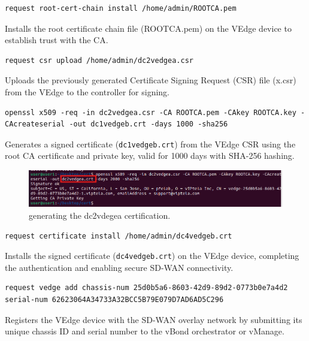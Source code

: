 \documentclass[12pt,english]{report}
\begin{document}
\begin{lstlisting}[style=BashStyle]
request root-cert-chain install /home/admin/ROOTCA.pem
\end{lstlisting}

Installs the root certificate chain file (ROOTCA.pem) on the VEdge device to establish trust with the CA.

\begin{lstlisting}[style=BashStyle]
request csr upload /home/admin/dc2vedgea.csr
\end{lstlisting}

Uploads the previously generated Certificate Signing Request (CSR) file (x.csr) from the VEdge to the controller for signing.

\begin{lstlisting}[style=BashStyle]
openssl x509 -req -in dc2vedgea.csr -CA ROOTCA.pem -CAkey ROOTCA.key -CAcreateserial -out dc1vedgeb.crt -days 1000 -sha256
\end{lstlisting}

Generates a signed certificate (\texttt{dc1vedgeb.crt}) from the VEdge CSR using the root CA certificate and private key, valid for 1000 days with SHA-256 hashing.

\begin{figure}[H]
    \centering
    \includegraphics[width=1\textwidth]{appendix/dc2vedgea-crt.png}
    \caption{generating the dc2vdegea certification.}
    \label{fig:dc2vdegea certification}
\end{figure}

\begin{lstlisting}[style=BashStyle]
request certificate install /home/admin/dc4vedgeb.crt
\end{lstlisting}

Installs the signed certificate (\texttt{dc4vedgeb.crt}) on the VEdge device, completing the authentication and enabling secure SD-WAN connectivity.

\begin{lstlisting}[style=BashStyle]
request vedge add chassis-num 25d0b5a6-8603-42d9-89d2-0773b0e7a4d2 serial-num 62623064A34733A32BCC5B79E079D7AD6AD5C296
\end{lstlisting}

Registers the VEdge device with the SD-WAN overlay network by submitting its unique chassis ID and serial number to the vBond orchestrator or vManage.
\end{document}
